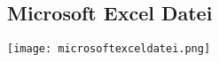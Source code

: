 \begin{landscape}\centering
\subsection{Microsoft Excel Datei}
\label{sec:Anhang:MicrosoftExcelDatei}
\centering
\texttt{[image: microsoftexceldatei.png]}
\end{landscape}
